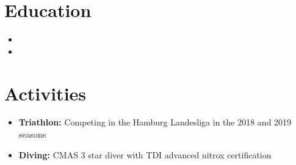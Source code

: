\documentclass{myfancycv}
\begin{document}
\section{Education}
  \vspace*{-0.5em}

\begin{itemize}
\item{}
\item{}
\end{itemize}

  \vspace*{-0.9em}
\section{Activities}

\begin{itemize}
  \vspace*{-0.5em}
	\item {\bf Triathlon:} Competing in the Hamburg Landesliga in the 2018 and 2019 seasons
	\item {\bf Diving:} CMAS 3 star diver with TDI advanced nitrox certification
\end{itemize}
\end{document}
